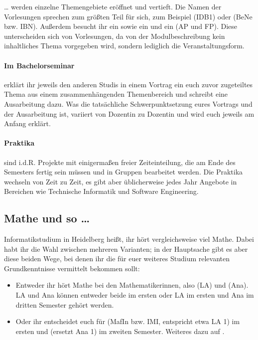 \dots{} werden einzelne Themengebiete eröffnet und vertieft. Die Namen der Vorlesungen sprechen zum größten Teil für sich, zum Beispiel  (\gls{IDB1}) oder  (\gls{BeNe} bzw. \gls{IBN}). Außerdem besucht ihr ein  sowie ein  und ein  (\gls{AP} und \gls{FP}). Diese unterscheiden sich von Vorlesungen, da von der Modulbeschreibung kein inhaltliches Thema vorgegeben wird, sondern lediglich die Veranstaltungsform.

\paragraph*{Im Bachelorseminar} erklärt ihr jeweils den anderen Studis in einem Vortrag ein euch zuvor zugeteiltes Thema aus einem zusammenhängenden Themenbereich und schreibt eine Ausarbeitung dazu. Was die tatsächliche Schwerpunktsetzung eures Vortrags und der Ausarbeitung ist, variiert von Dozentin zu Dozentin und wird euch jeweils am Anfang erklärt.

\paragraph*{Praktika} sind i.d.R. Projekte mit einigermaßen freier Zeiteinteilung, die am Ende des Semesters fertig sein müssen und in Gruppen bearbeitet werden. Die Praktika wechseln von Zeit zu Zeit, es gibt aber üblicherweise jedes Jahr Angebote in Bereichen wie Technische Informatik und Software Engineering.

\subsection{Mathe und so \dots}

Informatikstudium in Heidelberg heißt, ihr hört vergleichsweise viel Mathe. Dabei habt ihr die Wahl zwischen mehreren Varianten; in der Hauptsache gibt es aber diese beiden Wege, bei denen ihr die für euer weiteres Studium relevanten Grundkenntnisse vermittelt bekommen sollt:

\begin{itemize}
    \item Entweder ihr hört Mathe bei den Mathematikerinnen, also  (\gls{LA}) und  (\gls{Ana}). \gls{LA} und \gls{Ana} können entweder beide im ersten oder \gls{LA} im ersten und \gls{Ana} im dritten Semester gehört werden.
    \item Oder ihr entscheidet euch für  (\gls{MafIn} bzw. IMI, entspricht etwa \gls{LA} 1) im ersten und  (ersetzt \gls{Ana} 1) im zweiten Semester. Weiteres dazu auf .
\end{itemize}

